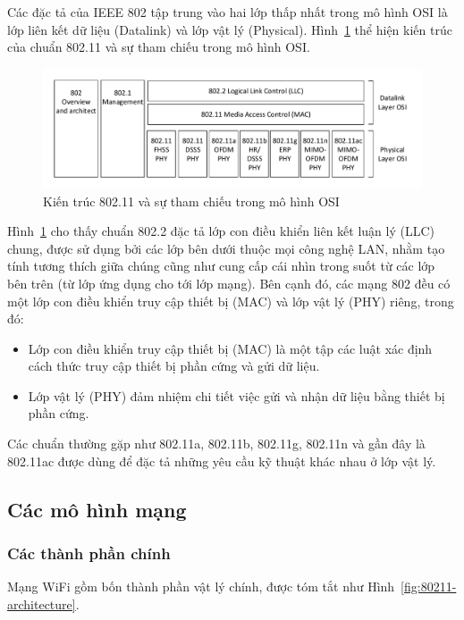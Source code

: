 Các đặc tả của IEEE 802 tập trung vào hai lớp thấp nhất trong mô hình OSI là lớp liên kết dữ liệu (Datalink) và lớp vật lý (Physical). Hình~\ref{fig:80211-reference-osi} thể hiện kiến trúc của chuẩn 802.11 và sự tham chiếu trong mô hình OSI.

\begin{figure}[!htbp]
    \centering
    \includegraphics[width=1.0\textwidth]{80211-reference-osi}
    \caption{
        \label{fig:80211-reference-osi}
        Kiến trúc 802.11 và sự tham chiếu trong mô hình OSI}%
\end{figure}

Hình~\ref{fig:80211-reference-osi} cho thấy chuẩn 802.2 đặc tả lớp con điều khiển liên kết luận lý (LLC) chung, được sử dụng bởi các lớp bên dưới thuộc mọi công nghệ LAN, nhằm tạo tính tương thích giữa chúng cũng như cung cấp cái nhìn trong suốt từ các lớp bên trên (từ lớp ứng dụng cho tới lớp mạng). Bên cạnh đó, các mạng 802 đều có một lớp con điều khiển truy cập thiết bị (MAC) và lớp vật lý (PHY) riêng, trong đó:
\begin{itemize}
\item Lớp con điều khiển truy cập thiết bị (MAC) là một tập các luật xác định cách thức truy cập thiết bị phần cứng và gửi dữ liệu.
\item Lớp vật lý (PHY) đảm nhiệm chi tiết việc gửi và nhận dữ liệu bằng thiết bị phần cứng.
\end{itemize}

Các chuẩn thường gặp như 802.11a, 802.11b, 802.11g, 802.11n và gần đây là 802.11ac được dùng để đặc tả những yêu cầu kỹ thuật khác nhau ở lớp vật lý.

\subsection{Các mô hình mạng}

\subsubsection{Các thành phần chính}
Mạng WiFi gồm bốn thành phần vật lý chính, được tóm tắt như Hình~\ref{fig:80211-architecture}.

